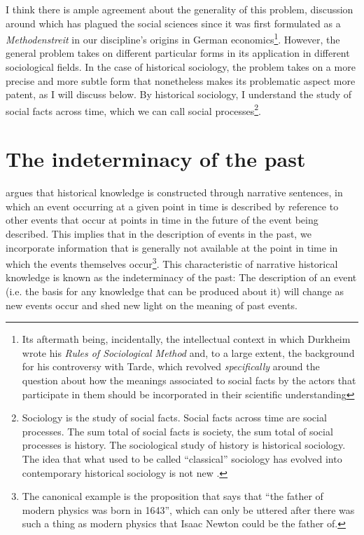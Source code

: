 I think there is ample agreement about the generality of this problem, discussion around which has plagued the social sciences since it was first formulated as a \textit{Methodenstreit} in our discipline's origins in German economics\footnote{
    \label{foot:tarde}
    Its aftermath being, incidentally, the intellectual context in which Durkheim wrote his \emph{Rules of Sociological Method} and, to a large extent, the background for his controversy with Tarde, which revolved \emph{specifically} around the question about how the meanings associated to social facts by the actors that participate in them should be incorporated in their scientific understanding
}.
However, the general problem takes on different particular forms in its application in different sociological fields.
In the case of historical sociology, the problem takes on a more precise and more subtle form that nonetheless makes its problematic aspect more patent, as I will discuss below.
By historical sociology, I understand the study of social facts across time, which we can call social processes\footnote{
    \label{foot:histsoc}
    Sociology is the study of social facts.
    Social facts across time are social processes.
    The sum total of social facts is society, the sum total of social processes is history.
    The sociological study of history is historical sociology.
    The idea that what used to be called ``classical'' sociology has evolved into contemporary historical sociology is not new \citep{mahoney2003a}.
}.

\section*{The indeterminacy of the past}
\label{sec:indeterminacy}

\citet{danto1985} argues that historical knowledge is constructed through narrative sentences, in which an event occurring at a given point in time is described by reference to other events that occur at points in time in the future of the event being described.
This implies that in the description of events in the past, we incorporate information that is generally not available at the point in time in which the events themselves occur\footnote{
    The canonical example is the proposition that says that ``the father of modern physics was born in 1643'', which can only be uttered after there was such a thing as modern physics that Isaac Newton could be the father of.
}.
This characteristic of narrative historical knowledge is known as the indeterminacy of the past:
The description of an event (i.e. the basis for any knowledge that can be produced about it) will change as new events occur and shed new light on the meaning of past events.

